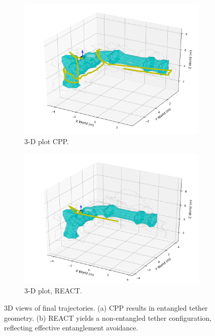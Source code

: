 \begin{figure}[ht]
    \centering
    \begin{subfigure}[b]{0.48\linewidth}
        \centering
        \includegraphics[width=\linewidth]{figures/fc_planner_final_view.pdf}
        \caption{3-D plot CPP.}
        \label{fig:3d_cpp}
    \end{subfigure}
    \hfill
    \begin{subfigure}[b]{0.48\linewidth}
        \centering
        \includegraphics[width=\linewidth]{figures/ta_planner_final_view.pdf}
        \caption{3-D plot, \ac{REACT}.}
        \label{fig:3d_oea}
    \end{subfigure}
    \caption{3D views of final trajectories. (a) CPP results in entangled tether geometry. (b) \ac{REACT} yields a non-entangled tether configuration, reflecting effective entanglement avoidance.}
    \label{fig:3Dplots}
\end{figure}




